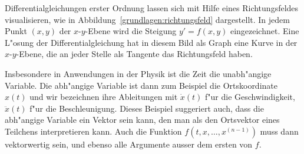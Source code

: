 Differentialgleichungen erster Ordnung lassen sich mit Hilfe eines
Richtungsfeldes visualisieren, wie in Abbildung~\ref{grundlagen:richtungsfeld}
dargestellt.
%
In jedem Punkt $(x,y)$ der $x$-$y$-Ebene wird die Steigung $y'=f(x,y)$
eingezeichnet.
Eine L"osung der Differentialgleichung hat in diesem Bild als Graph
eine Kurve in der $x$-$y$-Ebene, die an jeder Stelle als Tangente 
das Richtungsfeld haben.

Insbesondere in Anwendungen in der Physik ist die Zeit die
unabh"angige Variable.
Die abh"angige Variable ist dann zum Beispiel die Ortskoordinate
$x(t)$ und wir bezeichnen ihre Ableitungen mit $\dot{x}(t)$ f"ur
die Geschwindigkeit, $\ddot{x}(t)$ f"ur die Beschleunigung.
Dieses Beispiel suggeriert auch, dass die abh"angige Variable 
ein Vektor sein kann, den man als den Ortsvektor eines Teilchens
interpretieren kann.
Auch die Funktion $f(t,x,\dots,x^{(n-1)})$ muss dann vektorwertig sein, und
ebenso alle Argumente ausser dem ersten von $f$.

